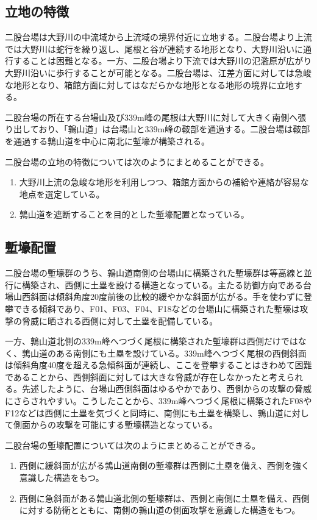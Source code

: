 \documentclass[14Q]{jsarticle}
\begin{document}
\subsection{立地の特徴}
二股台場は大野川の中流域から上流域の境界付近に立地する。二股台場より上流では大野川は蛇行を繰り返し、尾根と谷が連続する地形となり、大野川沿いに通行することは困難となる。一方、二股台場より下流では大野川の氾濫原が広がり大野川沿いに歩行することが可能となる。二股台場は、江差方面に対しては急峻な地形となり、箱館方面に対してはなだらかな地形となる地形の境界に立地する。

二股台場の所在する台場山及び339m峰の尾根は大野川に対して大きく南側へ張り出しており、「鶉山道」は台場山と339m峰の鞍部を通過する。二股台場は鞍部を通過する鶉山道を中心に南北に塹壕が構築される。

二股台場の立地の特徴については次のようにまとめることができる。

\begin{enumerate}
\item 大野川上流の急峻な地形を利用しつつ、箱館方面からの補給や連絡が容易な地点を選定している。
\item 鶉山道を遮断することを目的とした塹壕配置となっている。
\end{enumerate}

\subsection{塹壕配置}
二股台場の塹壕群のうち、鶉山道南側の台場山に構築された塹壕群は等高線と並行に構築され、西側に土塁を設ける構造となっている。主たる防御方向である台場山西斜面は傾斜角度20度前後の比較的緩やかな斜面が広がる。手を使わずに登攀できる傾斜であり、F01、F03、F04、F18などの台場山に構築された塹壕は攻撃の脅威に晒される西側に対して土塁を配備している。

一方、鶉山道北側の339m峰へつづく尾根に構築された塹壕群は西側だけではなく、鶉山道のある南側にも土塁を設けている。339m峰へつづく尾根の西側斜面は傾斜角度40度を超える急傾斜面が連続し、ここを登攀することはきわめて困難であることから、西側斜面に対しては大きな脅威が存在しなかったと考えられる。先述したように、台場山西側斜面はゆるやかであり、西側からの攻撃の脅威にさらされやすい。こうしたことから、339m峰へつづく尾根に構築されたF08やF12などは西側に土塁を気づくと同時に、南側にも土塁を構築し、鶉山道に対して側面からの攻撃を可能にする塹壕構造となっている。

二股台場の塹壕配置については次のようにまとめることができる。

\begin{enumerate}
\item 西側に緩斜面が広がる鶉山道南側の塹壕群は西側に土塁を備え、西側を強く意識した構造をもつ。
\item 西側に急斜面がある鶉山道北側の塹壕群は、西側と南側に土塁を備え、西側に対する防衛とともに、南側の鶉山道の側面攻撃を意識した構造をもつ。
\end{enumerate}
\end{document}
